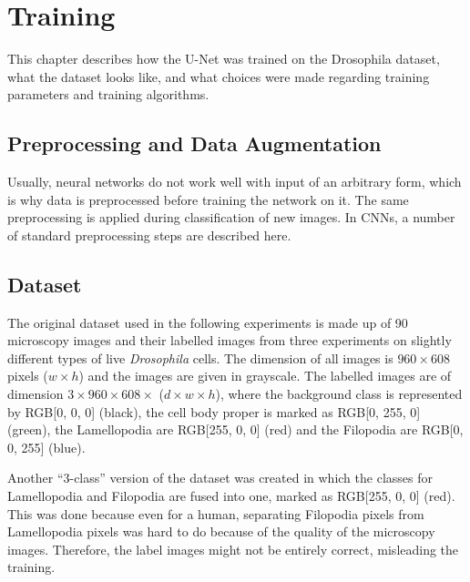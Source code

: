 	\chapter{Training}
This chapter describes how the U-Net was trained on the Drosophila dataset, what the dataset looks like, and what choices were made regarding training parameters and training algorithms.


	\section {Preprocessing and Data Augmentation}
Usually, neural networks do not work well with input of an arbitrary form, which is why data is preprocessed before training the network on it. The same preprocessing is applied during classification of new images. In CNNs, a number of standard preprocessing steps are described here.

	\section{Dataset}
The original dataset used in the following experiments is made up of 90 microscopy images and their labelled images from three experiments on slightly different types of live \textit{Drosophila} cells. The dimension of all images is $960 \times 608$ pixels ($w \times h$) and the images are given in grayscale. The labelled images are of dimension $3 \times 960 \times 608 \times$ ($d \times w \times h$), where the background class is represented by RGB[0, 0, 0] (black), the cell body proper is marked as RGB[0, 255, 0] (green), the Lamellopodia are RGB[255, 0, 0] (red) and the Filopodia are RGB[0, 0, 255] (blue).

Another ``3-class'' version of the dataset was created in which the classes for Lamellopodia and Filopodia are fused into one, marked as RGB[255, 0, 0] (red). This was done because even for a human, separating Filopodia pixels from Lamellopodia pixels was hard to do because of the quality of the microscopy images. Therefore, the label images might not be entirely correct, misleading the training.\\

